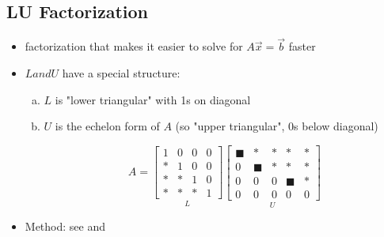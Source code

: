 \documentclass[a4paper,12pt]{article}
\theoremstyle{definition}
\theoremstyle{definition}
\newcommand{\mateq}[3]{#1#2 = #3}
\newcommand{\mateqaxb}{\mateq{A}{\vec{x}}{\vec{b}}}
\begin{document}
	\subsection{LU Factorization}
	\begin{itemize}
		\item factorization that makes it easier to solve for $\mateqaxb$ faster
		
		\item $L and U$ have a special structure:
		\begin{enumerate}[a.]
			\item $L$ is "lower triangular" with 1s on diagonal
			
			\item $U$ is the echelon form of $A$ (so "upper triangular", 0s below diagonal)
			
			\begin{equation}
				A =
				\underset{L}
				{\begin{bmatrix}
						1 & 0 & 0 & 0\\
						* & 1 & 0 & 0\\
						* & * & 1 & 0\\
						* & * & * & 1
				\end{bmatrix}}
				\underset{U}
				{\begin{bmatrix}
						\blacksquare & * & * & * & *\\
						0 & \blacksquare & * & * & *\\
						0 & 0 & 0 & \blacksquare & *\\
						0 & 0 & 0 & 0 & 0
				\end{bmatrix}}
			\end{equation}
		\end{enumerate}
		
		\item Method: see  and 
	\end{itemize}
	
\end{document}
